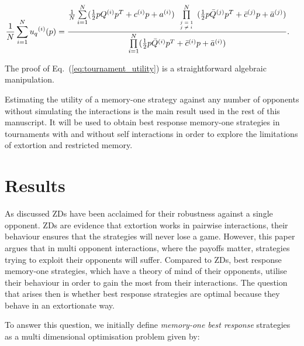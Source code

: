 \documentclass[10pt]{article}
\begin{document}
\begin{align}\label{eq:tournament_utility}
       & \frac{1}{N} \sum\limits_{i=1} ^ {N} {u_q}^{(i)} (p) = 
       \frac{\frac{1}{N} \sum\limits_{i=1} ^ {N} (\frac{1}{2} pQ^{(i)} p^T + c^{(i)} p + a^ {(i)})
       \prod\limits_{\tiny\begin{array}{l} j=1 \\ j \neq i \end{array}} ^
       N (\frac{1}{2} p\bar{Q}^{(j)} p^T + \bar{c}^{(j)} p + \bar{a}^ {(j)})}
       {\prod\limits_{i=1} ^ N (\frac{1}{2} p\bar{Q}^{(i)} p^T + \bar{c}^{(i)} p + \bar{a}^ {(i)})}.
\end{align}

The proof of Eq.~(\ref{eq:tournament_utility}) is a straightforward algebraic
manipulation.

Estimating the utility of a memory-one strategy against any number of opponents
without simulating the interactions is the main result used in the rest of this manuscript.
It will be used to obtain best response memory-one strategies in tournaments
with and without self interactions in order to explore the limitations of extortion
and restricted memory.

\section{Results}

As discussed ZDs have been acclaimed for their robustness
against a single opponent. ZDs are evidence that extortion works
in pairwise interactions, their behaviour ensures that the strategies will never
lose a game. However, this paper argues that in multi opponent interactions,
where the payoffs matter, strategies trying to exploit their opponents will
suffer.
Compared to ZDs, best response memory-one strategies, which have a
theory of mind of their opponents, utilise their behaviour in order to gain the
most from their interactions. The question that arises then is whether best
response strategies are optimal because they behave in an extortionate way.

To answer this question, we initially define \textit{memory-one best response}
strategies as a multi dimensional optimisation problem given by:
\end{document}
